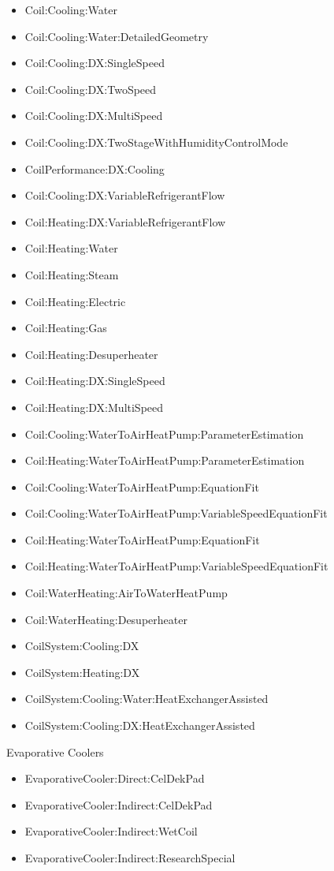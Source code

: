 \begin{itemize}
\tightlist
\item
  Coil:Cooling:Water
\item
  Coil:Cooling:Water:DetailedGeometry
\item
  Coil:Cooling:DX:SingleSpeed
\item
  Coil:Cooling:DX:TwoSpeed
\item
  Coil:Cooling:DX:MultiSpeed
\item
  Coil:Cooling:DX:TwoStageWithHumidityControlMode
\item
  CoilPerformance:DX:Cooling
\item
  Coil:Cooling:DX:VariableRefrigerantFlow
\item
  Coil:Heating:DX:VariableRefrigerantFlow
\item
  Coil:Heating:Water
\item
  Coil:Heating:Steam
\item
  Coil:Heating:Electric
\item
  Coil:Heating:Gas
\item
  Coil:Heating:Desuperheater
\item
  Coil:Heating:DX:SingleSpeed
\item
  Coil:Heating:DX:MultiSpeed
\item
  Coil:Cooling:WaterToAirHeatPump:ParameterEstimation
\item
  Coil:Heating:WaterToAirHeatPump:ParameterEstimation
\item
  Coil:Cooling:WaterToAirHeatPump:EquationFit
\item
  Coil:Cooling:WaterToAirHeatPump:VariableSpeedEquationFit
\item
  Coil:Heating:WaterToAirHeatPump:EquationFit
\item
  Coil:Heating:WaterToAirHeatPump:VariableSpeedEquationFit
\item
  Coil:WaterHeating:AirToWaterHeatPump
\item
  Coil:WaterHeating:Desuperheater
\item
  CoilSystem:Cooling:DX
\item
  CoilSystem:Heating:DX
\item
  CoilSystem:Cooling:Water:HeatExchangerAssisted
\item
  CoilSystem:Cooling:DX:HeatExchangerAssisted
\end{itemize}

Evaporative Coolers

\begin{itemize}
\tightlist
\item
  EvaporativeCooler:Direct:CelDekPad
\item
  EvaporativeCooler:Indirect:CelDekPad
\item
  EvaporativeCooler:Indirect:WetCoil
\item
  EvaporativeCooler:Indirect:ResearchSpecial
\end{itemize}

